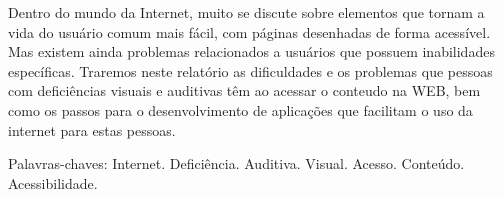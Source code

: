 \documentclass[
	12pt,				%
	oneside,			%
	a4paper,			%
	english,			%
	brazil				%
	]{abntex2ppgsi}
\begin{document}
\frenchspacing 


%
% 
%
\imprimircapa

\imprimirfolhaderosto


\setlength{\absparsep}{18pt} %
\begin{resumo}

Dentro do mundo da Internet, muito se discute sobre elementos que tornam a vida do usuário comum mais fácil, com páginas desenhadas de forma acessível. Mas existem ainda problemas relacionados a usuários que possuem inabilidades específicas. Traremos neste relatório as dificuldades e os problemas que pessoas com deficiências visuais e auditivas têm ao acessar o conteudo na WEB, bem como os passos para o desenvolvimento de aplicações que facilitam o uso da internet para estas pessoas.

Palavras-chaves: Internet. Deficiência. Auditiva. Visual. Acesso. Conteúdo. Acessibilidade.
\end{resumo}
\end{document}

